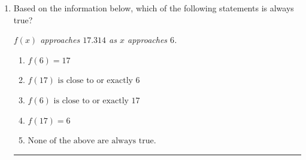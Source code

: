 \documentclass[14pt]{extbook}
\newcommand{\litem}[1]{\item#1\hspace*{-1cm}\rule{\textwidth}{0.4pt}}
\begin{document}
\begin{enumerate}
{\begin{enumerate}[label=\Alph*.]
\end{enumerate} }
\litem{
Based on the information below, which of the following statements is always true?
\begin{center}
    \textit{ $f(x)$ approaches $17.314$ as $x$ approaches $6$. }
\end{center}
\begin{enumerate}[label=\Alph*.]
\item \( f(6) = 17 \)
\item \( f(17) \text{ is close to or exactly } 6 \)
\item \( f(6) \text{ is close to or exactly } 17 \)
\item \( f(17) = 6 \)
\item \( \text{None of the above are always true.} \)

\end{enumerate} }
\end{enumerate}
\end{document}
